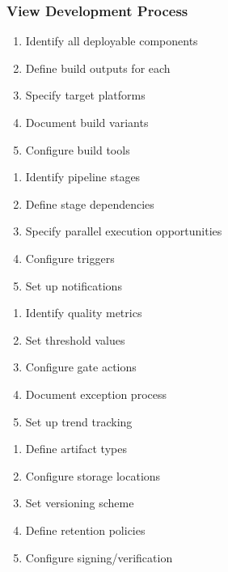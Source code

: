 \documentclass[11pt,letterpaper]{article}
\begin{document}
\subsubsection{View Development Process}

\begin{guidancebox}
\begin{enumerate}[nosep]
    \item Identify all deployable components
    \item Define build outputs for each
    \item Specify target platforms
    \item Document build variants
    \item Configure build tools
\end{enumerate}
\end{guidancebox}

\begin{guidancebox}
\begin{enumerate}[nosep]
    \item Identify pipeline stages
    \item Define stage dependencies
    \item Specify parallel execution opportunities
    \item Configure triggers
    \item Set up notifications
\end{enumerate}
\end{guidancebox}

\begin{guidancebox}
\begin{enumerate}[nosep]
    \item Identify quality metrics
    \item Set threshold values
    \item Configure gate actions
    \item Document exception process
    \item Set up trend tracking
\end{enumerate}
\end{guidancebox}

\begin{guidancebox}
\begin{enumerate}[nosep]
    \item Define artifact types
    \item Configure storage locations
    \item Set versioning scheme
    \item Define retention policies
    \item Configure signing/verification
\end{enumerate}
\end{guidancebox}
\end{document}
